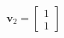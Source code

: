 \documentclass[preview]{standalone}
\begin{document}
\begin{align*}
\mathbf{v}_2 = \left[\begin{matrix}1 \\1\end{matrix}\right]
\end{align*}
\end{document}
